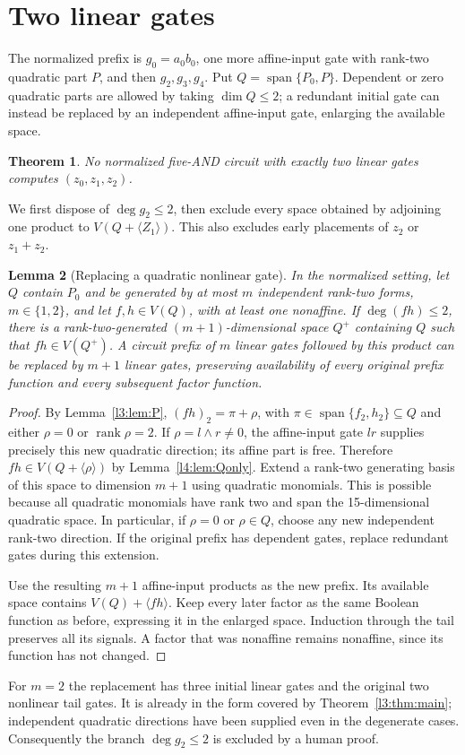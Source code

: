 \documentclass[11pt,a4paper]{article}
\theoremstyle{plain}
\newtheorem{theorem}{Theorem}
\newtheorem{lemma}[theorem]{Lemma}
\theoremstyle{remark}
\newcommand{\Span}{\operatorname{span}}
\newcommand{\rk}{\operatorname{rank}}
\begin{document}
\section{Two linear gates}\label{sec:lambda2}
The normalized prefix is $g_0=a_0b_0$, one more affine-input gate with rank-two quadratic part $P$, and then $g_2,g_3,g_4$. Put $Q=\Span\{P_0,P\}$. Dependent or zero quadratic parts are allowed by taking $\dim Q\le2$; a redundant initial gate can instead be replaced by an independent affine-input gate, enlarging the available space.


\begin{theorem}\label{l2:thm:main}
No normalized five-AND circuit with exactly two linear gates computes $(z_0,z_1,z_2)$.
\end{theorem}
We first dispose of $\deg g_2\le2$, then exclude every space obtained by adjoining one product to $V(Q+\langle Z_1\rangle)$. This also excludes early placements of $z_2$ or $z_1+z_2$.

\begin{lemma}[Replacing a quadratic nonlinear gate]\label{l2:lem:replace}
In the normalized setting, let $Q$ contain $P_0$ and be generated by at most $m$ independent rank-two forms, $m\in\{1,2\}$, and let $f,h\in V(Q)$, with at least one nonaffine. If $\deg(fh)\le2$, there is a rank-two-generated $(m+1)$-dimensional space $Q^+$ containing $Q$ such that $fh\in V(Q^+)$. A circuit prefix of $m$ linear gates followed by this product can be replaced by $m+1$ linear gates, preserving availability of every original prefix function and every subsequent factor function.
\end{lemma}
\begin{proof}
By Lemma~\ref{l3:lem:P}, $(fh)_2=\pi+\rho$, with $\pi\in\Span\{f_2,h_2\}\subseteq Q$ and either $\rho=0$ or $\rk\rho=2$. If $\rho=l\wedge r\ne0$, the affine-input gate $lr$ supplies precisely this new quadratic direction; its affine part is free. Therefore $fh\in V(Q+\langle\rho\rangle)$ by Lemma~\ref{l4:lem:Qonly}. Extend a rank-two generating basis of this space to dimension $m+1$ using quadratic monomials. This is possible because all quadratic monomials have rank two and span the 15-dimensional quadratic space. In particular, if $\rho=0$ or $\rho\in Q$, choose any new independent rank-two direction. If the original prefix has dependent gates, replace redundant gates during this extension.

Use the resulting $m+1$ affine-input products as the new prefix. Its available space contains $V(Q)+\langle fh\rangle$. Keep every later factor as the same Boolean function as before, expressing it in the enlarged space. Induction through the tail preserves all its signals. A factor that was nonaffine remains nonaffine, since its function has not changed.
\end{proof}
For $m=2$ the replacement has three initial linear gates and the original two nonlinear tail gates. It is already in the form covered by Theorem~\ref{l3:thm:main}; independent quadratic directions have been supplied even in the degenerate cases. Consequently the branch $\deg g_2\le2$ is excluded by a human proof.
\end{document}
